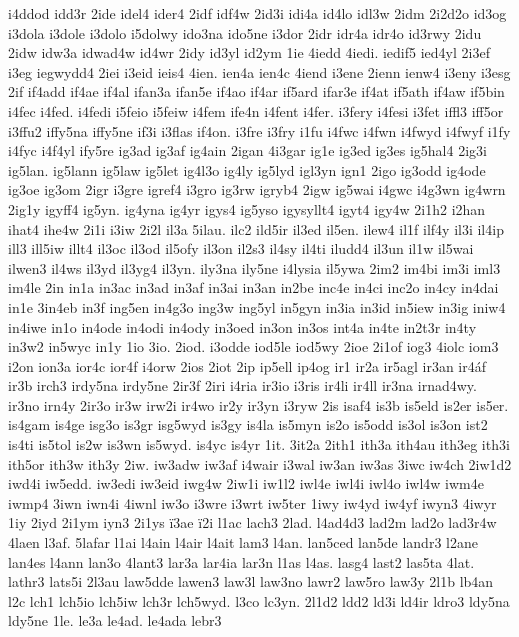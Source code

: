 {i4ddod
idd3r
2ide
idel4
ider4
2idf
idf4w
2id3i
idi4a
id4lo
idl3w
2idm
2i2d2o
id3og
i3dola
i3dole
i3dolo
i5dolwy
ido3na
ido5ne
i3dor
2idr
idr4a
idr4o
id3rwy
2idu
2idw
idw3a
idwad4w
id4wr
2idy
id3yl
id2ym
1ie
4iedd
4iedi.
iedif5
ied4yl
2i3ef
i3eg
iegwydd4
2iei
i3eid
ieis4
4ien.
ien4a
ien4c
4iend
i3ene
2ienn
ienw4
i3eny
i3esg
2if
if4add
if4ae
if4al
ifan3a
ifan5e
if4ao
if4ar
if5ard
ifar3e
if4at
if5ath
if4aw
if5bin
i4fec
i4fed.
i4fedi
i5feio
i5feiw
i4fem
ife4n
i4fent
i4fer.
i3fery
i4fesi
i3fet
iffl3
iff5or
i3ffu2
iffy5na
iffy5ne
if3i
i3flas
if4on.
i3fre
i3fry
i1fu
i4fwc
i4fwn
i4fwyd
i4fwyf
i1fy
i4fyc
i4f4yl
ify5re
ig3ad
ig3af
ig4ain
2igan
4i3gar
ig1e
ig3ed
ig3es
ig5hal4
2ig3i
ig5lan.
ig5lann
ig5law
ig5let
ig4l3o
ig4ly
ig5lyd
igl3yn
ign1
2igo
ig3odd
ig4ode
ig3oe
ig3om
2igr
i3gre
igref4
i3gro
ig3rw
igryb4
2igw
ig5wai
i4gwc
i4g3wn
ig4wrn
2ig1y
igyff4
ig5yn.
ig4yna
ig4yr
igys4
ig5yso
igysyllt4
igyt4
igy4w
2i1h2
i2han
ihat4
ihe4w
2i1i
i3iw
2i2l
il3a
5ilau.
ilc2
ild5ir
il3ed
il5en.
ilew4
il1f
ilf4y
il3i
il4ip
ill3
ill5iw
illt4
il3oc
il3od
il5ofy
il3on
il2s3
il4sy
il4ti
iludd4
il3un
il1w
il5wai
ilwen3
il4ws
il3yd
il3yg4
il3yn.
ily3na
ily5ne
i4lysia
il5ywa
2im2
im4bi
im3i
iml3
im4le
2in
in1a
in3ac
in3ad
in3af
in3ai
in3an
in2be
inc4e
in4ci
inc2o
in4cy
in4dai
in1e
3in4eb
in3f
ing5en
in4g3o
ing3w
ing5yl
in5gyn
in3ia
in3id
in5iew
in3ig
iniw4
in4iwe
in1o
in4ode
in4odi
in4ody
in3oed
in3on
in3os
int4a
in4te
in2t3r
in4ty
in3w2
in5wyc
in1y
1io
3io.
2iod.
i3odde
iod5le
iod5wy
2ioe
2i1of
iog3
4iolc
iom3
i2on
ion3a
ior4c
ior4f
i4orw
2ios
2iot
2ip
ip5ell
ip4og
ir1
ir2a
ir5agl
ir3an
ir4áf
ir3b
irch3
irdy5na
irdy5ne
2ir3f
2iri
i4ria
ir3io
i3ris
ir4li
ir4ll
ir3na
irnad4wy.
ir3no
irn4y
2ir3o
ir3w
irw2i
ir4wo
ir2y
ir3yn
i3ryw
2is
isaf4
is3b
is5eld
is2er
is5er.
is4gam
is4ge
isg3o
is3gr
isg5wyd
is3gy
is4la
is5myn
is2o
is5odd
is3ol
is3on
ist2
is4ti
is5tol
is2w
is3wn
is5wyd.
is4yc
is4yr
1it.
3it2a
2ith1
ith3a
ith4au
ith3eg
ith3i
ith5or
ith3w
ith3y
2iw.
iw3adw
iw3af
i4wair
i3wal
iw3an
iw3as
3iwc
iw4ch
2iw1d2
iwd4i
iw5edd.
iw3edi
iw3eid
iwg4w
2iw1i
iw1l2
iwl4e
iwl4i
iwl4o
iwl4w
iwm4e
iwmp4
3iwn
iwn4i
4iwnl
iw3o
i3wre
i3wrt
iw5ter
1iwy
iw4yd
iw4yf
iwyn3
4iwyr
1iy
2iyd
2i1ym
iyn3
2i1ys
ï3ae
ï2i
l1ac
lach3
2lad.
l4ad4d3
lad2m
lad2o
lad3r4w
4laen
l3af.
5lafar
l1ai
l4ain
l4air
l4ait
lam3
l4an.
lan5ced
lan5de
landr3
l2ane
lan4es
l4ann
lan3o
4lant3
lar3a
lar4ia
lar3n
l1as
l4as.
lasg4
last2
las5ta
4lat.
lathr3
lats5i
2l3au
law5dde
lawen3
law3l
law3no
lawr2
law5ro
law3y
2l1b
lb4an
l2c
lch1
lch5io
lch5iw
lch3r
lch5wyd.
l3co
lc3yn.
2l1d2
ldd2
ld3i
ld4ir
ldro3
ldy5na
ldy5ne
1le.
le3a
le4ad.
le4ada
lebr3
}
